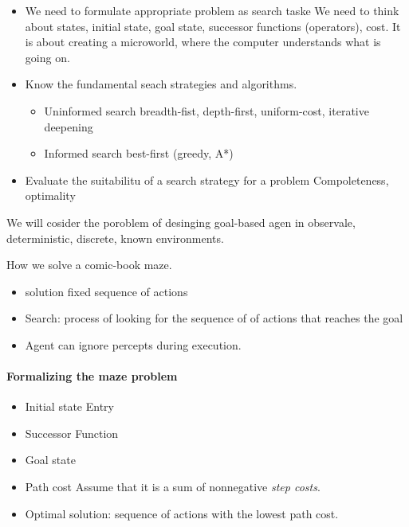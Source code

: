 \documentclass{article}
\begin{document}
\begin{itemize}
  \item We need to formulate appropriate problem as search taske 
    \subitem We need to think about states, initial state, goal state, successor
    functions (operators), cost. It is about creating a microworld, where the
    computer understands what is going on.
  \item Know the fundamental seach strategies and algorithms.
    \begin{itemize}
      
      \item Uninformed search 
      \subitem breadth-fist, depth-first, uniform-cost,
      iterative deepening
      \item Informed search
      \subitem best-first (greedy, A*)
    \end{itemize}
  \item Evaluate the suitabilitu of a search strategy for a problem
    \subitem Compoleteness, optimality
\end{itemize}

We will cosider the poroblem of desinging goal-based agen in observale,
deterministic, discrete, known environments. 

How we solve a comic-book maze.
\begin{itemize}
  \item solution fixed sequence of actions 
  \item Search: process  of looking for the sequence of of actions that reaches
    the goal
  \item Agent can ignore percepts during execution.
\end{itemize}

\paragraph{Formalizing the maze problem}

\begin{itemize}
  \item Initial state 
    \subitem Entry 
  \item Successor Function
  \item Goal state 
  \item Path cost
    \subitem Assume that it is a sum of nonnegative \textit{step costs}.
  \item Optimal solution: sequence of actions with the lowest path cost.
\end{itemize}
\end{document}

